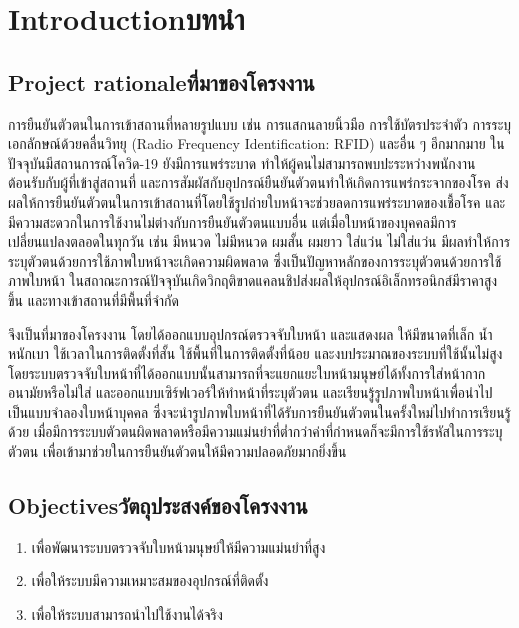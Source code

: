 \chapter{\ifenglish Introduction\else บทนำ\fi}

\section{\ifenglish Project rationale\else ที่มาของโครงงาน\fi}
การยืนยันตัวตนในการเข้าสถานที่หลายรูปแบบ เช่น การแสกนลายนิ้วมือ การใช้บัตรประจำตัว  การระบุเอกลักษณ์ด้วยคลื่นวิทยุ (Radio Frequency Identification: RFID) และอื่น ๆ อีกมากมาย 
ในปัจจุบันมีสถานการณ์โควิด-19 ยังมีการแพร่ระบาด ทำให้ผู้คนไม่สามารถพบปะระหว่างพนักงานต้อนรับกับผู้ที่เข้าสู่สถานที่ และการสัมผัสกับอุปกรณ์ยืนยันตัวตนทำให้เกิดการแพร่กระจากของโรค 
ส่งผลให้การยืนยันตัวตนในการเข้าสถานที่โดยใช้รูปถ่ายใบหน้าจะช่วยลดการแพร่ระบาดของเชื้อโรค และมีความสะดวกในการใช้งานไม่ต่างกับการยืนยันตัวตนแบบอื่น แต่เมื่อใบหน้าของบุคคลมีการเปลี่ยนแปลงตลอดในทุกวัน 
เช่น มีหนวด ไม่มีหนวด ผมสั้น ผมยาว ใส่แว่น ไม่ใส่แว่น มีผลทำให้การระบุตัวตนด้วยการใช้ภาพใบหน้าจะเกิดความผิดพลาด ซึ่งเป็นปัญหาหลักของการระบุตัวตนด้วยการใช้ภาพใบหน้า
ในสถาณะการณ์ปัจจุบันเกิดวิกฤติขาดแคลนชิปส่งผลให้อุปกรณ์อิเล็กทรอนิกส์มีราคาสูงขึ้น และทางเข้าสถานที่มีพื้นที่จำกัด

\indent จึงเป็นที่มาของโครงงาน โดยได้ออกแบบอุปกรณ์ตรวจจับใบหน้า และแสดงผล ให้มีขนาดที่เล็ก น้ำหนักเบา ใช้เวลาในการติดตั้งที่สั้น ใช้พื้นที่ในการติดตั้งที่น้อย และงบประมาณของระบบที่ใช้นั้นไม่สูง 
โดยระบบตรวจจับใบหน้าที่ได้ออกแบบนั้นสามารถที่จะแยกแยะใบหน้ามนุษย์ได้ทั้งการใส่หน้ากากอนามัยหรือไม่ใส่ และออกแบบเซิร์ฟเวอร์ให้ทำหน้าที่ระบุตัวตน และเรียนรู้รูปภาพใบหน้าเพื่อนำไปเป็นแบบจำลองใบหน้าบุคคล 
ซึ่งจะนำรูปภาพใบหน้าที่ได้รับการยืนยันตัวตนในครั้งใหม่ไปทำการเรียนรู้ด้วย เมื่อมีการระบบตัวตนผิดพลาดหรือมีความแม่นยำที่ต่ำกว่าค่าที่กำหนดก็จะมีการใช้รหัสในการระบุตัวตน 
เพื่อเข้ามาช่วยในการยืนยันตัวตนให้มีความปลอดภัยมากยิ่งขึ้น

\section{\ifenglish Objectives\else วัตถุประสงค์ของโครงงาน\fi}
\begin{enumerate}
    \item เพื่อพัฒนาระบบตรวจจับใบหน้ามนุษย์ให้มีความแม่นยำที่สูง
    \item เพื่อให้ระบบมีความเหมาะสมของอุปกรณ์ที่ติดตั้ง
    \item เพื่อให้ระบบสามารถนำไปใช้งานได้จริง
\end{enumerate}

